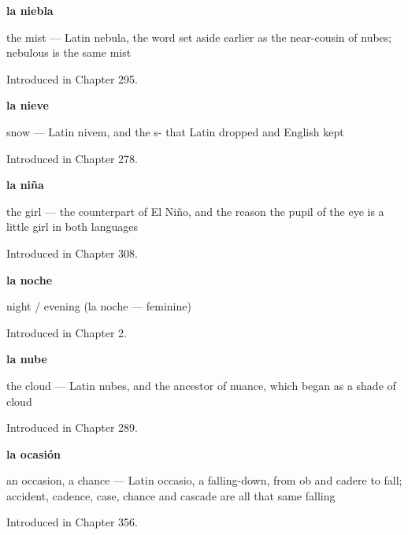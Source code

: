 \noindent\begin{minipage}[t]{\linewidth}
\raggedright
\textbf{la niebla}\par
\small the mist — Latin nebula, the word set aside earlier as the near-cousin of nubes; nebulous is the same mist\par
\footnotesize Introduced in Chapter 295.
\end{minipage}\par\medskip

\noindent\begin{minipage}[t]{\linewidth}
\raggedright
\textbf{la nieve}\par
\small snow — Latin nivem, and the s- that Latin dropped and English kept\par
\footnotesize Introduced in Chapter 278.
\end{minipage}\par\medskip

\noindent\begin{minipage}[t]{\linewidth}
\raggedright
\textbf{la niña}\par
\small the girl --- the counterpart of El Niño, and the reason the pupil of the eye is a little girl in both languages\par
\footnotesize Introduced in Chapter 308.
\end{minipage}\par\medskip

\noindent\begin{minipage}[t]{\linewidth}
\raggedright
\textbf{la noche}\par
\small night / evening (la noche — feminine)\par
\footnotesize Introduced in Chapter 2.
\end{minipage}\par\medskip

\noindent\begin{minipage}[t]{\linewidth}
\raggedright
\textbf{la nube}\par
\small the cloud — Latin nubes, and the ancestor of nuance, which began as a shade of cloud\par
\footnotesize Introduced in Chapter 289.
\end{minipage}\par\medskip

\noindent\begin{minipage}[t]{\linewidth}
\raggedright
\textbf{la ocasión}\par
\small an occasion, a chance — Latin occasio, a falling-down, from ob and cadere to fall; accident, cadence, case, chance and cascade are all that same falling\par
\footnotesize Introduced in Chapter 356.
\end{minipage}\par\medskip

